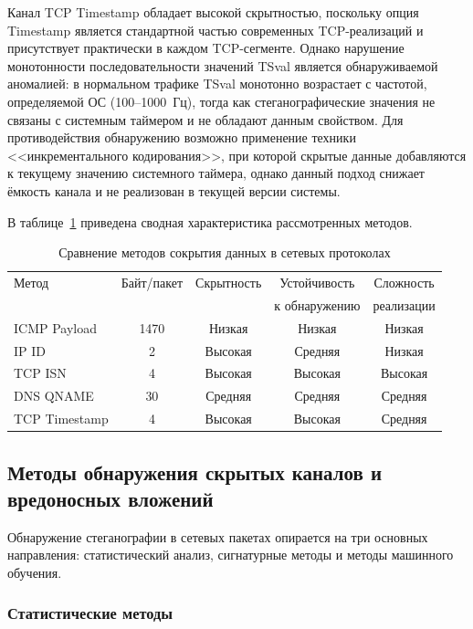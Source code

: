 Канал TCP Timestamp обладает высокой скрытностью, поскольку опция Timestamp является стандартной частью современных TCP-реализаций и присутствует практически в каждом TCP-сегменте. Однако нарушение монотонности последовательности значений TSval является обнаруживаемой аномалией: в нормальном трафике TSval монотонно возрастает с частотой, определяемой ОС (100--1000~Гц), тогда как стеганографические значения не связаны с системным таймером и не обладают данным свойством. Для противодействия обнаружению возможно применение техники <<инкрементального кодирования>>, при которой скрытые данные добавляются к текущему значению системного таймера, однако данный подход снижает ёмкость канала и не реализован в текущей версии системы.

В таблице~\ref{tab:stego_methods_comparison} приведена сводная характеристика рассмотренных методов.

\begin{table}[htb]
\centering
\caption{Сравнение методов сокрытия данных в сетевых протоколах}
\label{tab:stego_methods_comparison}
\begin{tabular}{|l|c|c|c|c|}
\hline
Метод & Байт/пакет & Скрытность & Устойчивость & Сложность \\
 & & & к обнаружению & реализации \\
\hline
ICMP Payload   & 1470 & Низкая  & Низкая   & Низкая   \\
IP ID          & 2    & Высокая & Средняя  & Низкая   \\
TCP ISN        & 4    & Высокая & Высокая  & Высокая  \\
DNS QNAME      & 30   & Средняя & Средняя  & Средняя  \\
TCP Timestamp  & 4    & Высокая & Высокая  & Средняя  \\
\hline
\end{tabular}
\end{table}

\subsection{Методы обнаружения скрытых каналов и вредоносных вложений}

Обнаружение стеганографии в сетевых пакетах опирается на три основных направления: статистический анализ, сигнатурные методы и методы машинного обучения.

\subsubsection{Статистические методы}

